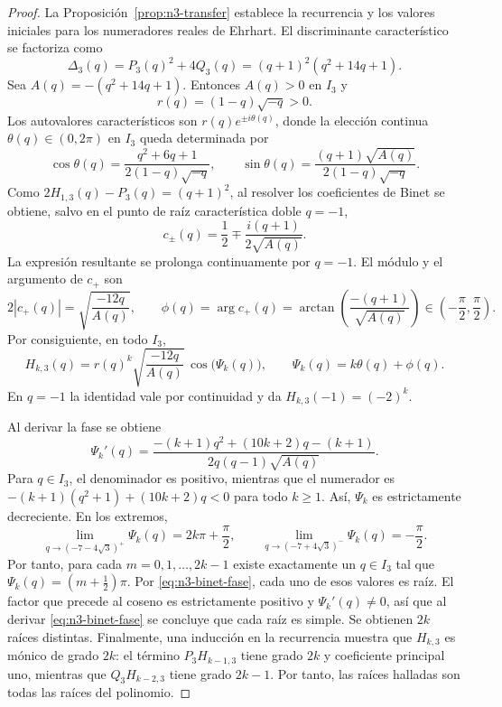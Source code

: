 \documentclass[11pt,a4paper]{article}
\theoremstyle{definition}
\begin{document}
\begin{proof}
La Proposición~\ref{prop:n3-transfer} establece la recurrencia y los
valores iniciales para los numeradores reales de Ehrhart. El
discriminante característico se factoriza como
\[
\Delta_3(q)=P_3(q)^2+4Q_3(q)
=(q+1)^2(q^2+14q+1).
\]
Sea $A(q)=-(q^2+14q+1)$. Entonces $A(q)>0$ en $I_3$ y
\[
r(q)=(1-q)\sqrt{-q}>0.
\]
Los autovalores característicos son $r(q)e^{\pm i\theta(q)}$, donde
la elección continua $\theta(q)\in(0,2\pi)$ en $I_3$ queda determinada
por
\[
\cos\theta(q)=\frac{q^2+6q+1}{2(1-q)\sqrt{-q}},\qquad
\sin\theta(q)=\frac{(q+1)\sqrt{A(q)}}{2(1-q)\sqrt{-q}}.
\]
Como $2H_{1,3}(q)-P_3(q)=(q+1)^2$, al resolver los coeficientes de
Binet se obtiene, salvo en el punto de raíz característica doble
$q=-1$,
\[
c_\pm(q)=\frac12\mp\frac{i(q+1)}{2\sqrt{A(q)}}.
\]
La expresión resultante se prolonga continuamente por $q=-1$. El
módulo y el argumento de $c_+$ son
\[
2|c_+(q)|=\sqrt{\frac{-12q}{A(q)}},\qquad
\phi(q)=\arg c_+(q)
=\arctan\!\left(\frac{-(q+1)}{\sqrt{A(q)}}\right)
\in\left(-\frac\pi2,\frac\pi2\right).
\]
Por consiguiente, en todo $I_3$,
\begin{equation}\label{eq:n3-binet-fase}
H_{k,3}(q)=r(q)^k
\sqrt{\frac{-12q}{A(q)}}\,
\cos\bigl(\Psi_k(q)\bigr),
\qquad \Psi_k(q)=k\theta(q)+\phi(q).
\end{equation}
En $q=-1$ la identidad vale por continuidad y da
$H_{k,3}(-1)=(-2)^k$.

Al derivar la fase se obtiene
\[
\Psi_k'(q)=
\frac{-(k+1)q^2+(10k+2)q-(k+1)}
{2q(q-1)\sqrt{A(q)}}.
\]
Para $q\in I_3$, el denominador es positivo, mientras que el numerador
es $-(k+1)(q^2+1)+(10k+2)q<0$ para todo $k\ge1$. Así, $\Psi_k$ es
estrictamente decreciente. En los extremos,
\[
\lim_{q\to(-7-4\sqrt3)^+}\Psi_k(q)
=2k\pi+\frac\pi2,\qquad
\lim_{q\to(-7+4\sqrt3)^-}\Psi_k(q)=-\frac\pi2.
\]
Por tanto, para cada $m=0,1,\ldots,2k-1$ existe exactamente un
$q\in I_3$ tal que $\Psi_k(q)=(m+\tfrac12)\pi$. Por
\eqref{eq:n3-binet-fase}, cada uno de esos valores es raíz. El factor
que precede al coseno es estrictamente positivo y
$\Psi_k'(q)\ne0$, así que al derivar
\eqref{eq:n3-binet-fase} se concluye que cada raíz es simple. Se
obtienen $2k$ raíces distintas. Finalmente, una inducción en la
recurrencia muestra que $H_{k,3}$ es mónico de grado $2k$: el término
$P_3H_{k-1,3}$ tiene grado $2k$ y coeficiente principal uno, mientras
que $Q_3H_{k-2,3}$ tiene grado $2k-1$. Por tanto, las raíces halladas
son todas las raíces del polinomio.
\end{proof}
\end{document}
